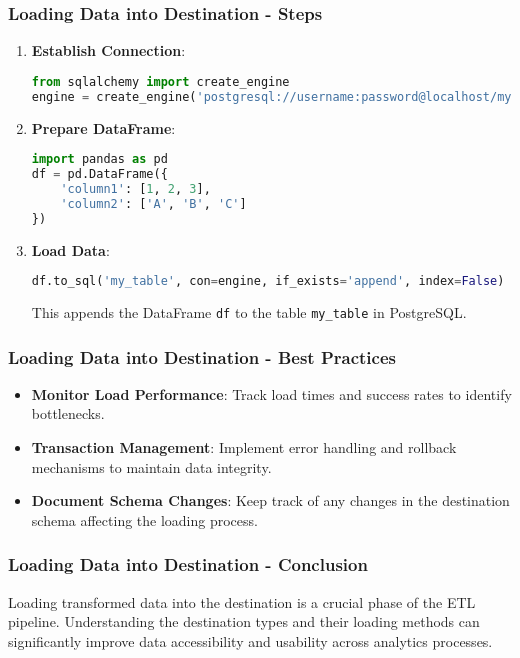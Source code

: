 \documentclass[aspectratio=169]{beamer}
\begin{document}
\begin{frame}[fragile]
    \frametitle{Loading Data into Destination - Steps}
    \begin{enumerate}
        \item \textbf{Establish Connection}:
            \begin{lstlisting}[language=Python]
from sqlalchemy import create_engine
engine = create_engine('postgresql://username:password@localhost/mydatabase')
            \end{lstlisting}

        \item \textbf{Prepare DataFrame}:
            \begin{lstlisting}[language=Python]
import pandas as pd
df = pd.DataFrame({
    'column1': [1, 2, 3],
    'column2': ['A', 'B', 'C']
})
            \end{lstlisting}

        \item \textbf{Load Data}:
            \begin{lstlisting}[language=Python]
df.to_sql('my_table', con=engine, if_exists='append', index=False)
            \end{lstlisting}
            This appends the DataFrame \texttt{df} to the table \texttt{my\_table} in PostgreSQL.
    \end{enumerate}
\end{frame}

\begin{frame}[fragile]
    \frametitle{Loading Data into Destination - Best Practices}
    \begin{itemize}
        \item \textbf{Monitor Load Performance}: Track load times and success rates to identify bottlenecks.
        \item \textbf{Transaction Management}: Implement error handling and rollback mechanisms to maintain data integrity.
        \item \textbf{Document Schema Changes}: Keep track of any changes in the destination schema affecting the loading process.
    \end{itemize}
\end{frame}

\begin{frame}[fragile]
    \frametitle{Loading Data into Destination - Conclusion}
    Loading transformed data into the destination is a crucial phase of the ETL pipeline. 
    Understanding the destination types and their loading methods can significantly improve data accessibility and usability across analytics processes.
\end{frame}
\end{document}
